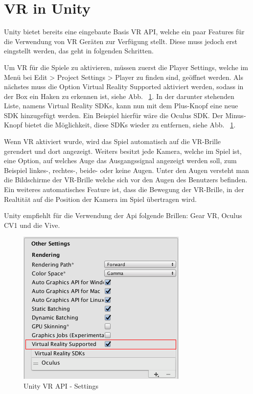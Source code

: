 \section{VR in Unity}\label{sec:vr-in-unity}
Unity bietet bereits eine eingebaute Basis VR API, welche ein paar Features für die Verwendung von VR Geräten zur Verfügung stellt.
Diese muss jedoch erst eingstellt werden, das geht in folgenden Schritten.

Um VR für die Spiele zu aktivieren, müssen zuerst die Player Settings, welche im Menü bei Edit > Project Settings > Player zu finden sind, geöffnet werden.
Als nächstes muss die Option Virtual Reality Supported aktiviert werden, sodass in der Box ein Haken zu erkennen ist, siehe Abb. ~\ref{fig:unity_vr_api_settings}.
In der darunter stehenden Liste, namens Virtual Reality SDKs, kann nun mit dem Plus-Knopf eine neue SDK hinzugefügt werden.
Ein Beispiel hierfür wäre die Oculus SDK.
Der Minus-Knopf bietet die Möglichkeit, diese SDKs wieder zu entfernen, siehe Abb. ~\ref{fig:unity_vr_api_settings}.
~\cite{Unity_VR_Overview_2022}

Wenn VR aktiviert wurde, wird das Spiel automatisch auf die VR-Brille gerendert und dort angezeigt.
Weiters besitzt jede Kamera, welche im Spiel ist, eine Option, auf welches Auge das Ausgangssignal angezeigt werden soll, zum Beispiel linkes-, rechtes-, beide- oder keine Augen.
Unter den Augen versteht man die Bildschirme der VR-Brille welche sich vor den Augen des Benutzers befinden.
Ein weiteres automatisches Feature ist, dass die Bewegung der VR-Brille, in der Realtität auf die Position der Kamera im Spiel übertragen wird.

Unity empfiehlt für die Verwendung der Api folgende Brillen: Gear VR, Oculus CV1 und die Vive.
~\cite{Unity_VR_Overview_2022}

\begin {figure}
    \centering
    \includegraphics[scale=0.8]{pics/unity_basis_vr_api_settings}
    \caption{Unity VR API - Settings}
    \label{fig:unity_vr_api_settings}
\end {figure}

